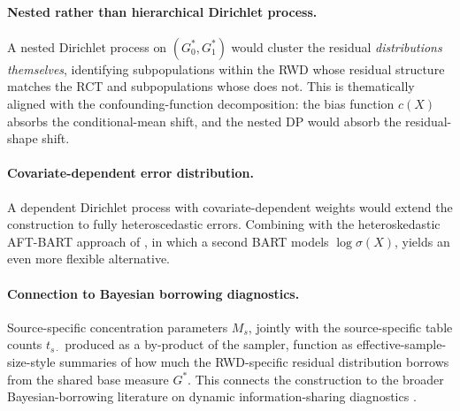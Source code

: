 \documentclass[11pt]{article}
\newcommand{\1}{\mathbf{1}}
\begin{document}
\paragraph{Nested rather than hierarchical Dirichlet process.} A nested Dirichlet process \citep{rodriguez2008nested} on $(G_0^*, G_1^*)$ would cluster the residual \emph{distributions themselves}, identifying subpopulations within the RWD whose residual structure matches the RCT and subpopulations whose does not. This is thematically aligned with the confounding-function decomposition: the bias function $c(X)$ absorbs the conditional-mean shift, and the nested DP would absorb the residual-shape shift.

\paragraph{Covariate-dependent error distribution.} A dependent Dirichlet process \citep{maceachern1999dependent} with covariate-dependent weights would extend the construction to fully heteroscedastic errors. Combining with the heteroskedastic AFT-BART approach of \citet{sparapani2023nonparametric}, in which a second BART models $\log \sigma(X)$, yields an even more flexible alternative.

\paragraph{Connection to Bayesian borrowing diagnostics.} Source-specific concentration parameters $M_s$, jointly with the source-specific table counts $t_{s\cdot}$ produced as a by-product of the sampler, function as effective-sample-size-style summaries of how much the RWD-specific residual distribution borrows from the shared base measure $G^*$. This connects the construction to the broader Bayesian-borrowing literature on dynamic information-sharing diagnostics \citep{hupf2021bayesian}.



\end{document}
